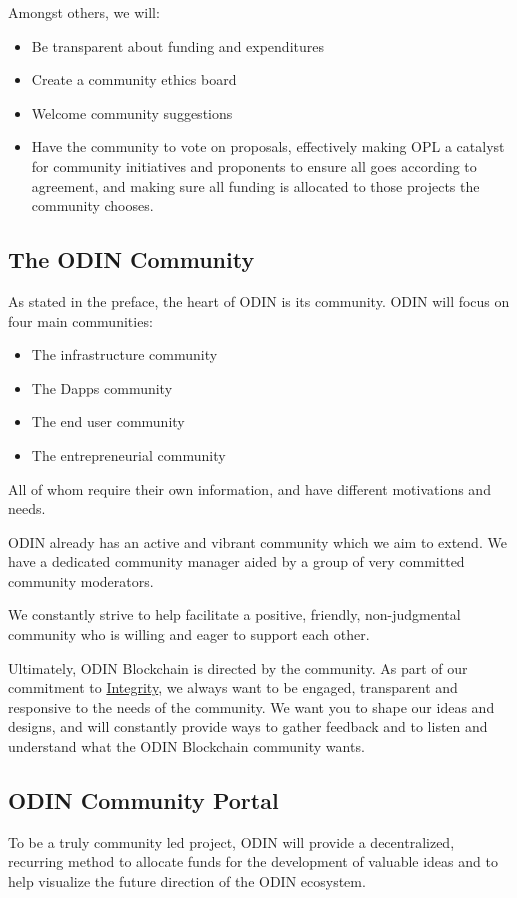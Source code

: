 \documentclass[12pt,letterpaper]{article}
\begin{document}
Amongst others, we will:
\begin{itemize}
   \item Be transparent about funding and expenditures
   \item Create a community ethics board
   \item Welcome community suggestions
   \item Have the community to vote on proposals, effectively making OPL a catalyst for community initiatives and proponents to ensure all goes according to agreement, and making sure all funding is allocated to those projects the community chooses.
\end{itemize}
   
\subsection{​The ODIN Community}
As stated in the preface, the heart of ODIN is its community. ODIN will focus on four main communities:
\begin{itemize}
   \item The infrastructure community
   \item The Dapps community
   \item The end user community 
   \item The entrepreneurial community
\end{itemize}
All of whom require their own information, and have different motivations and needs.

ODIN already has an active and vibrant community which we aim to extend. We have a dedicated community manager aided by a group of very committed community moderators.

We constantly strive to help facilitate a positive, friendly, non-judgmental community who is willing and eager to support each other. 

Ultimately, ODIN Blockchain is directed by the community. As part of our commitment to \href{https://odinblockchain.org/#integrity}{Integrity}, we always want to be engaged, transparent and responsive to the needs of the community. We want you to shape our ideas and designs, and will constantly provide ways to gather feedback and to listen and understand what the ODIN Blockchain community wants.

\subsection{ODIN Community Portal}
To be a truly community led project, ODIN will provide a decentralized, recurring method to allocate funds for the development of valuable ideas and to help visualize the future direction of the ODIN ecosystem.
\end{document}
